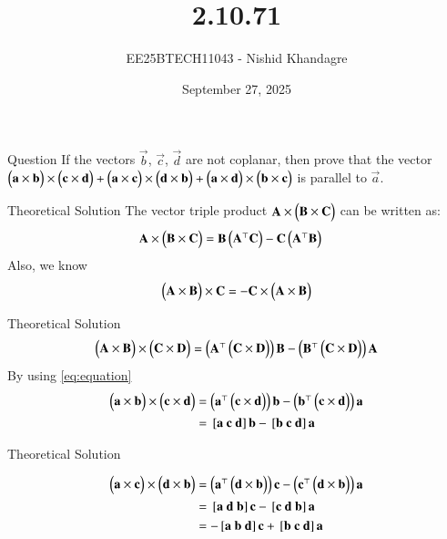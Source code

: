 \documentclass{beamer}
\title
{2.10.71}
\date{September 27, 2025}
\author
{EE25BTECH11043 - Nishid Khandagre}
\begin{document}
\frame{\titlepage}

\begin{frame}{Question}
If the vectors $\vec{b}$, $\vec{c}$, $\vec{d}$ are not coplanar, then prove that the vector
$\begin{pmatrix}\mathbf{a} \times\mathbf{b}\end{pmatrix} \times\begin{pmatrix}\mathbf{c} \times\mathbf{d}\end{pmatrix} + \begin{pmatrix}\mathbf{a} \times\mathbf{c}\end{pmatrix} \times\begin{pmatrix}\mathbf{d} \times\mathbf{b}\end{pmatrix} + \begin{pmatrix}\mathbf{a} \times\mathbf{d}\end{pmatrix} \times\begin{pmatrix}\mathbf{b} \times\mathbf{c}\end{pmatrix}$
is parallel to $\vec{a}$.
\end{frame}

\begin{frame}{Theoretical Solution}
The vector triple product $\mathbf{A} \times \begin{pmatrix}\mathbf{B} \times \mathbf{C}\end{pmatrix}$ can be written as:
\begin{align}
\mathbf{A} \times \begin{pmatrix}\mathbf{B} \times \mathbf{C}\end{pmatrix} &= \mathbf{B}\begin{pmatrix}\mathbf{A}^\top \mathbf{C}\end{pmatrix} - \mathbf{C}\begin{pmatrix}\mathbf{A}^\top \mathbf{B}\end{pmatrix}
\end{align}
Also, we know
\begin{align}
\begin{pmatrix}\mathbf{A} \times \mathbf{B}\end{pmatrix} \times \mathbf{C} = - \mathbf{C} \times \begin{pmatrix}\mathbf{A} \times \mathbf{B}\end{pmatrix}
\end{align}
\end{frame}

\begin{frame}{Theoretical Solution}
\begin{align}
\begin{pmatrix}\mathbf{A} \times \mathbf{B}\end{pmatrix} \times \begin{pmatrix}\mathbf{C} \times \mathbf{D}\end{pmatrix} = \begin{pmatrix}\mathbf{A}^\top \begin{pmatrix}\mathbf{C} \times \mathbf{D}\end{pmatrix}\end{pmatrix} \mathbf{B} - \begin{pmatrix}\mathbf{B}^\top \begin{pmatrix}\mathbf{C} \times \mathbf{D}\end{pmatrix}\end{pmatrix} \mathbf{A}
\label{eq:equation}
\end{align}
By using \eqref{eq:equation}
\begin{align}
\myvec{\vec{a} \times\vec{b}}\times \myvec{\vec{c} \times\vec{d}}&= \myvec{\vec{a}^\top \myvec{\vec{c} \times \vec{d}}} \vec{b} - \myvec{\vec{b}^\top \myvec{\vec{c} \times \vec{d}}} \vec{a}\\
&=\sbrak{\vec{a} \ \vec{c} \ \vec{d}}\vec{b} - \sbrak{\vec{b} \ \vec{c} \ \vec{d}}\vec{a}
\end{align}
\end{frame}

\begin{frame}{Theoretical Solution}

\begin{align}
\myvec{\vec{a} \times\vec{c}} \times\myvec{\vec{d} \times\vec{b}}&=
\myvec{\vec{a}^\top \myvec{\vec{d} \times \vec{b}}} \vec{c} - \myvec{\vec{c}^\top \myvec{\vec{d} \times \vec{b}}} \vec{a}\\
&= \sbrak{\vec{a} \ \vec{d} \ \vec{b}}\vec{c} - \sbrak{\vec{c} \ \vec{d} \ \vec{b}}\vec{a} \\
&= -\sbrak{\vec{a} \ \vec{b} \ \vec{d}}\vec{c} + \sbrak{\vec{b} \ \vec{c} \ \vec{d}}\vec{a}
\end{align}
\end{frame}
\end{document}
